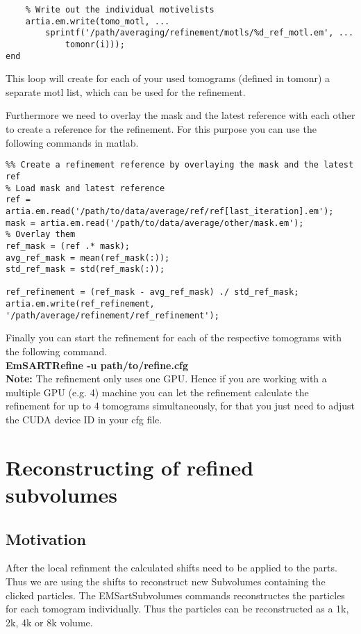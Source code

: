 \documentclass[12pt,a4paper]{scrartcl}
\begin{document}
{\begin{lstlisting}
    % Write out the individual motivelists
    artia.em.write(tomo_motl, ...
        sprintf('/path/averaging/refinement/motls/%d_ref_motl.em', ...
            tomonr(i)));
end
\end{lstlisting}

This loop will create for each of your used tomograms (defined in tomonr)  a separate motl list, which can be used for the refinement. 

Furthermore we need to overlay the mask and the latest reference with each other to create a reference for the refinement. For this purpose you can use the following commands in matlab.

\begin{lstlisting}
%% Create a refinement reference by overlaying the mask and the latest ref
% Load mask and latest reference
ref = artia.em.read('/path/to/data/average/ref/ref[last_iteration].em');
mask = artia.em.read('/path/to/data/average/other/mask.em');
% Overlay them
ref_mask = (ref .* mask);
avg_ref_mask = mean(ref_mask(:));
std_ref_mask = std(ref_mask(:));

ref_refinement = (ref_mask - avg_ref_mask) ./ std_ref_mask;
artia.em.write(ref_refinement, '/path/average/refinement/ref_refinement');
\end{lstlisting}

Finally you can start the refinement for each of the respective tomograms with the following command.\\

\textbf{EmSARTRefine -u path/to/refine.cfg}\\

\textbf{Note:} The refinement only uses one GPU. Hence if you are working with a multiple GPU (e.g. 4) machine you can let the refinement calculate the refinement for up to 4 tomograms simultaneously, for that you just need to adjust the CUDA device ID in your cfg file.  

\section{Reconstructing of refined subvolumes}
\label{Reconstructing of refined subvolumes}
\subsection{Motivation}
After the local refinment the calculated shifts need to be applied to the parts. Thus we are using the shifts to reconstruct new Subvolumes containing the clicked particles. The EMSartSubvolumes commands reconstructes the particles for each tomogram individually. Thus the particles can be reconstructed as a 1k, 2k, 4k or 8k volume. 
}
\end{document}
